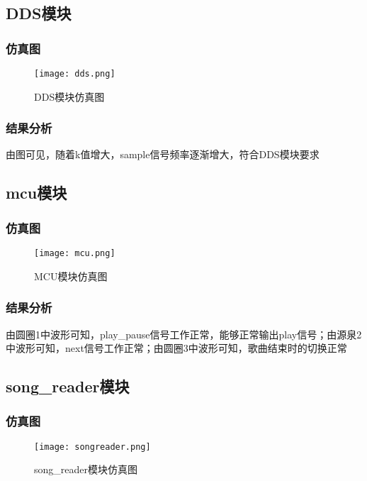 \documentclass{../source/zjureport}
\begin{document}
    \subsection{DDS模块}
        \subsubsection{仿真图}
        \begin{figure}[htp]
            \centering
            \texttt{[image: dds.png]}
            \caption{DDS模块仿真图}
        \end{figure}

        \subsubsection{结果分析}
        由图可见，随着k值增大，sample信号频率逐渐增大，符合DDS模块要求

    \subsection{mcu模块}
        \subsubsection{仿真图}
        \begin{figure}[htp]
            \centering
            \texttt{[image: mcu.png]}
            \caption{MCU模块仿真图}
        \end{figure}

        \subsubsection{结果分析}
        由圆圈1中波形可知，play_pause信号工作正常，能够正常输出play信号；由源泉2中波形可知，next信号工作正常；由圆圈3中波形可知，歌曲结束时的切换正常
        \newpage

    \subsection{song_reader模块}
        \subsubsection{仿真图}
        \begin{figure}[htp]
            \centering
            \texttt{[image: songreader.png]}
            \caption{song_reader模块仿真图}
        \end{figure}
\end{document}
